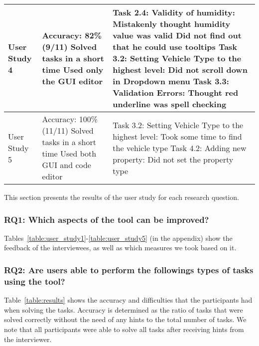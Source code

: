 \begin{table*}[!hbt]
\begin{tabular}{lp{4.5cm}p{6cm}}
        User Study 4 &
        Accuracy: 82\%(9/11)\newline
        Solved tasks in a short time\newline
        Used only the GUI editor

        &

        Task 2.4: Validity of humidity:\newline
        Mistakenly thought humidity value was valid\newline
        Did not find out that he could use tooltips\newline
        Task 3.2: Setting Vehicle Type to the highest level: \newline
        Did not scroll down in Dropdown menu\newline
        Task 3.3: Validation Errors:\newline
        Thought red underline was spell checking \\ \midrule

        User Study 5 &
        Accuracy: 100\%(11/11)\newline
        Solved tasks in a short time\newline
        Used both GUI and code editor

        &

        Task 3.2: Setting Vehicle Type to the highest level: \newline
        Took some time to find the vehicle type \newline
        Task 4.2: Adding new property:\newline
        Did not set the property type \\ \bottomrule
    \end{tabular}
\end{table*}
This section presents the results of the user study for each research question.

\subsubsection{\textbf{RQ1:} Which aspects of the tool can be improved?}\label{subsubsec:rq1} %
Tables~\ref{table:user_study1}-\ref{table:user_study5} (in the appendix) show the feedback of the interviewees, as well as which measures we took based on it.


\subsubsection{\textbf{RQ2:} Are users able to perform the followings types of tasks using the tool?}
Table~\ref{table:results} shows the accuracy and difficulties that the participants had when solving the tasks.
Accuracy is determined as the ratio of tasks that were solved correctly without the need of any hints to the total number of tasks.
We note that all participants were able to solve all tasks after receiving hints from the interviewer.


